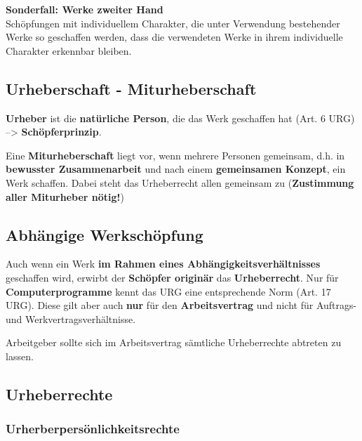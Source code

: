 \textbf{Sonderfall: Werke zweiter Hand}\\
Schöpfungen mit individuellem Charakter, die unter Verwendung
bestehender Werke so geschaffen werden, dass die verwendeten Werke in
ihrem individuelle Charakter erkennbar bleiben.

\hypertarget{urheberschaft---miturheberschaft}{%
\subsection{Urheberschaft -
Miturheberschaft}\label{urheberschaft---miturheberschaft}}

\textbf{Urheber} ist die \textbf{natürliche Person}, die das Werk
geschaffen hat (Art. 6 URG) --\textgreater{} \textbf{Schöpferprinzip}.

Eine \textbf{Miturheberschaft} liegt vor, wenn mehrere Personen
gemeinsam, d.h. in \textbf{bewusster Zusammenarbeit} und nach einem
\textbf{gemeinsamen Konzept}, ein Werk schaffen. Dabei steht das
Urheberrecht allen gemeinsam zu (\textbf{Zustimmung aller Miturheber
nötig!})

\hypertarget{abhuxe4ngige-werkschuxf6pfung}{%
\subsection{Abhängige
Werkschöpfung}\label{abhuxe4ngige-werkschuxf6pfung}}

Auch wenn ein Werk \textbf{im Rahmen eines Abhängigkeitsverhältnisses}
geschaffen wird, erwirbt der \textbf{Schöpfer originär} das
\textbf{Urheberrecht}. Nur für \textbf{Computerprogramme} kennt das URG
eine entsprechende Norm (Art. 17 URG). Diese gilt aber auch \textbf{nur}
für den \textbf{Arbeitsvertrag} und nicht für Auftrags- und
Werkvertragsverhältnisse.

Arbeitgeber sollte sich im Arbeitsvertrag sämtliche Urheberrechte
abtreten zu lassen.

\hypertarget{urheberrechte}{%
\subsection{Urheberrechte}\label{urheberrechte}}

\hypertarget{urherberpersuxf6nlichkeitsrechte}{%
\subsubsection{Urherberpersönlichkeitsrechte}\label{urherberpersuxf6nlichkeitsrechte}}

